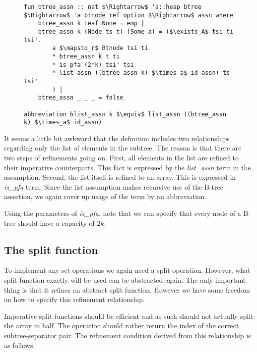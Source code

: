 \begin{figure}
\begin{lstlisting}[mathescape=true, language=Isabelle, caption={The refinement assertion for B-trees},
    label={lst:imp-btree-refine}]
fun btree_assn :: nat $\Rightarrow$ 'a::heap btree $\Rightarrow$ 'a btnode ref option $\Rightarrow$ assn where
    btree_assn k Leaf None = emp |
    btree_assn k (Node ts t) (Some a) = ($\exists_A$ tsi ti tsi'.
        a $\mapsto_r$ Btnode tsi ti
        * btree_assn k t ti
        * is_pfa (2*k) tsi' tsi
        * list_assn ((btree_assn k) $\times_a$ id_assn) ts tsi'
        ) |
    btree_assn _ _ _ = false

abbreviation blist_assn k $\equiv$ list_assn ((btree_assn k) $\times_a$ id_assn)

\end{lstlisting}
\end{figure}

It seems a little bit awkward that the definition
includes two relationships regarding only the list of elements in the subtree.
The reason is that there are two steps of refinements going on.
First, all elements in the list are refined to their imperative counterparts.
This fact is expressed by the \textit{list\_assn} term in the assumption.
Second, the list itself is refined to an array.
This is expressed in \textit{is\_pfa} term.
Since the list assumption makes recursive use of the
B-tree assertion, we again cover up usage of the term
by an abbreviation.

Using the parameters of \textit{is\_pfa},
note that we can specify that every node of a B-tree should have
a capacity of $2k$.

\subsection{The split function}
\label{sec:imp-split}

To implement any set operations we again need a split operation.
However, what split function exactly will be used can be abstracted again.
The only important thing is that it refines an abstract split function.
However we have some freedom on how to specify this refinement relationship.

Imperative split functions should be efficient and as such should not actually
split the array in half.
The operation should rather return the index of the correct
subtree-separator pair.
The refinement condition derived from this relationship is as follows.

